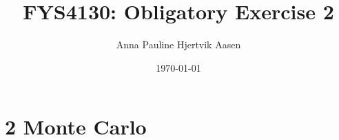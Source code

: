 \documentclass[twocolumn,english,notitlepage]{article}
\title{FYS4130: Obligatory Exercise 2}
\author{Anna Pauline Hjertvik Aasen}
\date{\today}
\begin{document}
\maketitle

\clearpage

\section*{2 Monte Carlo}

\end{document}
